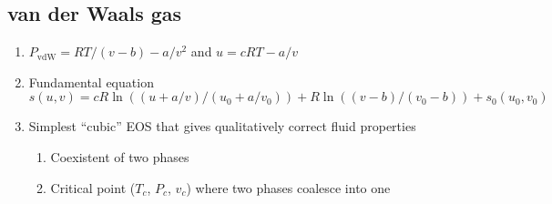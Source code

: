 \documentclass[11pt]{article}
\begin{document}
\subsection{van der Waals gas}
\label{sec:org2a5dd0d}
\begin{enumerate}
\item \(P_\text{vdW}=RT/(v-b) - a/v^2\) and \(u = cRT - a/v\)
\item Fundamental equation \(s(u,v)=cR \ln((u+a/v)/(u_0+a/v_0))+R  \ln ((v-b)/(v_0-b)) + s_0(u_0,v_0)\)
\item Simplest ``cubic'' EOS that gives qualitatively correct fluid properties
\begin{enumerate}
\item Coexistent of two phases
\item Critical point (\(T_c\), \(P_c\), \(v_c\)) where two phases coalesce into one
\end{enumerate}
\end{enumerate}
\end{document}
